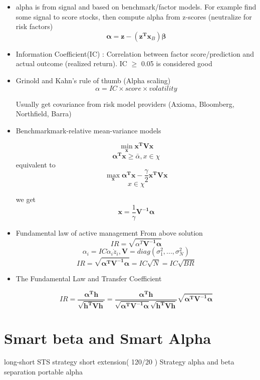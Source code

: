 \documentclass[11pt, openany]{book}              %
\begin{document}
\begin{itemize}
\item alpha is from signal and based on benchmark/factor models. For example find some signal to score stocks, then compute alpha from z-scores (neutralize for risk factors)
$$\boldsymbol{\alpha} = \mathbf{z} - (\mathbf{z^T}\mathbf{x}_B) \mathbf{\beta}$$

\item Information Coefficient(IC) : Correlation between factor score/prediction and actual outcome (realized return). IC $\geq$ 0.05 is considered good
\item Grinold and Kahn’s rule of thumb (Alpha scaling)
$$ \alpha = IC \times score \times volatility$$

Usually get covariance from risk model providers (Axioma, Bloomberg, Northfield, Barra)

\item Benchmarkmark-relative mean-variance models 

$$ \min_{\mathbf{x}} \mathbf{x^TVx} $$
$$ \boldsymbol{ \alpha^T x} \geq \bar{\alpha}, x \in \chi$$
equivalent to 
$$ \max_{\mathbf{x}} \boldsymbol{ \alpha^T x}  - \frac{\gamma}{2} \mathbf{x^TVx} $$
$$ x \in \chi$$

we get $$ \mathbf{x} = \frac{1}{\gamma} \boldsymbol{V^{-1}\alpha}$$

\item Fundamental law of active management
\subitem From above solution $$IR = \sqrt{\alpha^T\boldsymbol{V^{-1}\alpha}}$$
$$\alpha_i = IC \dot \alpha_i \dot z_i, \mathbf{V} = diag(\sigma_1^2, ..., \sigma_N^2)$$
$$IR = \sqrt{\boldsymbol{\alpha^T V^{-1}\alpha}} = IC \sqrt{N} = IC \sqrt{BR}$$
 
 \item The Fundamental Law and Transfer Coefficient
 
$$IR = \frac{\boldsymbol{\alpha^T h}}{\sqrt{\boldsymbol{h^TVh}}} = \frac{\boldsymbol{\alpha^T h}}{\sqrt{\boldsymbol{\alpha^T V^{-1}\alpha}}\sqrt{\boldsymbol{h^TVh}}} \sqrt{\boldsymbol{\alpha^T V^{-1}\alpha}}$$


\end{itemize}
\section{Smart beta and Smart Alpha}                  %

long-short STS strategy
short extension( 120/20 ) Strategy
alpha and beta separation
portable alpha 
\end{document}
